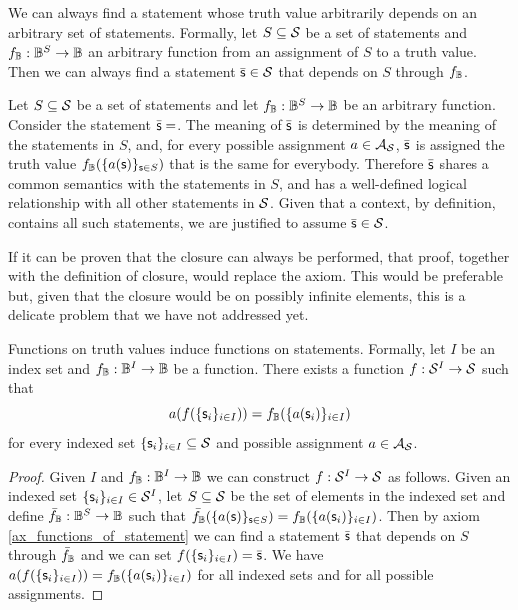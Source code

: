 \documentclass[11pt,letterpaper,fleqn]{memoir} %
\begin{document}
\begin{mathSection}
	\begin{axiom}\label{ax_functions_of_statement}
		We can always find a statement whose truth value arbitrarily depends on an arbitrary set of statements. Formally, let $S \subseteq \mathcal{S}$ be a set of statements and $f_{\mathbb{B}} : \mathbb{B}^S \to \mathbb{B}$ an arbitrary function from an assignment of $S$ to a truth value. Then we can always find a statement $\bar{\mathsf{s}} \in \mathcal{S}$ that depends on $S$ through $f_{\mathbb{B}}$.
	\end{axiom}
\begin{justification}
	Let $S \subseteq \mathcal{S}$ be a set of statements and let $f_{\mathbb{B}} : \mathbb{B}^S \to \mathbb{B}$ be an arbitrary function. Consider the statement $\bar{\mathsf{s}}=$. The meaning of $\bar{\mathsf{s}}$ is determined by the meaning of the statements in $S$, and, for every possible assignment $a \in \mathcal{A}_{\mathcal{S}}$, $\bar{\mathsf{s}}$ is assigned the truth value $f_{\mathbb{B}} (\{a(\mathsf{s})\}_{\mathsf{s} \in S})$ that is the same for everybody. Therefore $\bar{\mathsf{s}}$ shares a common semantics with the statements in $S$, and has a well-defined logical relationship with all other statements in $\mathcal{S}$. Given that a context, by definition, contains all such statements, we are justified to assume $\bar{\mathsf{s}} \in \mathcal{S}$.
\end{justification}

\begin{remark}
	If it can be proven that the closure can always be performed, that proof, together with the definition of closure, would replace the axiom. This would be preferable but, given that the closure would be on possibly infinite elements, this is a delicate problem that we have not addressed yet.
\end{remark}

\begin{coro}
	Functions on truth values induce functions on statements. Formally, let $I$ be an index set and $f_{\mathbb{B}} : \mathbb{B}^I \to \mathbb{B}$ be a function. There exists a function $f : \mathcal{S}^I \to \mathcal{S}$ such that
	$$a(f(\{\mathsf{s}_i\}_{i \in I})) = f_{\mathbb{B}}(\{a(\mathsf{s}_i)\}_{i \in I})$$
	for every indexed set $\{\mathsf{s}_i\}_{i \in I} \subseteq \mathcal{S}$ and possible assignment $a \in \mathcal{A}_{\mathcal{S}}$.
\end{coro}
\begin{proof}
	Given $I$ and $f_{\mathbb{B}} : \mathbb{B}^I \to \mathbb{B}$ we can construct $f : \mathcal{S}^I \to \mathcal{S}$ as follows. Given an indexed set $\{\mathsf{s}_i\}_{i \in I} \in \mathcal{S}^I$, let $S \subseteq \mathcal{S}$ be the set of elements in the indexed set and define $\bar{f}_{\mathbb{B}} : \mathbb{B}^S \to \mathbb{B}$ such that $\bar{f}_{\mathbb{B}}(\{a(\mathsf{s})\}_{\mathsf{s} \in S}) = f_{\mathbb{B}}(\{a(\mathsf{s}_i)\}_{i \in I})$. Then by axiom \ref{ax_functions_of_statement} we can find a statement $\bar{\mathsf{s}}$ that depends on $S$ through $\bar{f}_{\mathbb{B}}$ and we can set $f(\{\mathsf{s}_i\}_{i \in I}) = \bar{\mathsf{s}}$. We have $a(f(\{\mathsf{s}_i\}_{i \in I})) = f_{\mathbb{B}}(\{a(\mathsf{s}_i)\}_{i \in I})$ for all indexed sets and for all possible assignments.
\end{proof}
\end{mathSection}
\end{document}
